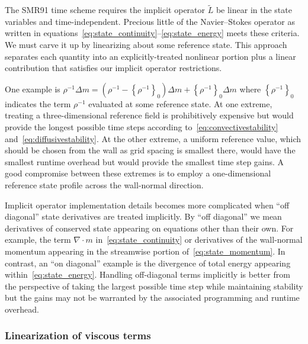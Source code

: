 \documentclass[letterpaper,11pt,nointlimits,reqno,draft]{amsart}
\newcommand{\reference}[1]{\ensuremath{\left\{#1\right\}_{0}}}
\newcommand{\lessreference}[1]
  {\ensuremath{\left({#1}-\reference{#1}\right)}}
\begin{document}
The SMR91 time scheme requires the implicit operator $\tilde{L}$ be linear in
the state variables and time-independent.  Precious little of the
Navier--Stokes operator as written in
equations~\eqref{eq:state_continuity}--\eqref{eq:state_energy} meets these
criteria.  We must carve it up by linearizing about some reference state.  This
approach separates each quantity into an explicitly-treated nonlinear portion
plus a linear contribution that satisfies our implicit operator restrictions.

One example is $\rho^{-1}\Delta{}m = \lessreference{\rho^{-1}}\Delta{}m +
\reference{\rho^{-1}}\Delta{}m$ where $\reference{\rho^{-1}}$ indicates the
term $\rho^{-1}$ evaluated at some reference state.  At one extreme, treating a
three-dimensional reference field is prohibitively expensive but would provide
the longest possible time steps according to~\eqref{eq:convectivestability}
and~\eqref{eq:diffusivestability}.  At the other extreme, a uniform reference
value, which should be chosen from the wall as grid spacing is smallest there,
would have the smallest runtime overhead but would provide the smallest time
step gains.  A good compromise between these extremes is to employ a
one-dimensional reference state profile across the wall-normal direction.

Implicit operator implementation details becomes more complicated when ``off
diagonal'' state derivatives are treated implicitly.  By ``off diagonal'' we
mean derivatives of conserved state appearing on equations other than their
own.  For example, the term $\nabla\cdot{}m$ in~\eqref{eq:state_continuity} or
derivatives of the wall-normal momentum appearing in the streamwise portion
of~\eqref{eq:state_momentum}.  In contrast, an ``on diagonal'' example is the
divergence of total energy appearing within~\eqref{eq:state_energy}.  Handling
off-diagonal terms implicitly is better from the perspective of taking the
largest possible time step while maintaining stability but the gains may not be
warranted by the associated programming and runtime overhead.

\subsubsection{Linearization of viscous terms}
\end{document}
